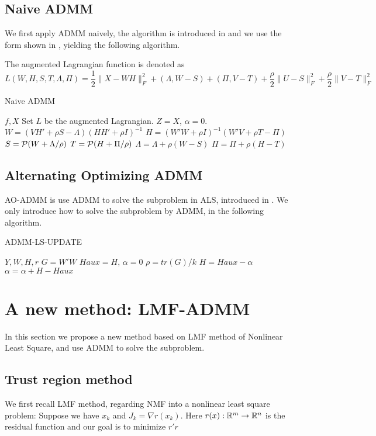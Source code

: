 \documentclass{article}
\renewcommand{\grad}{\nabla}
\begin{document}
\subsection{Naive ADMM}
We first apply ADMM naively, the algorithm is introduced in \cite{CITE} and we use the form shown in \cite{rk1admm}, yielding the following algorithm.

The augmented Lagrangian function is denoted as 
$$L(W,H,S,T,\Lambda, \Pi) = \frac{1}{2} \|X - WH\|_F^2 +  (\Lambda, W-S) + (\Pi, V-T) + \frac{\rho}{2}\|U-S\|_F^2 + \frac{\rho}{2} \|V-T\|_F^2$$

\begin{algorithm}
	\caption{Naive ADMM}
	\begin{algorithmic}[1]
		\REQUIRE $f, X$
		\STATE Set $L$ be the augmented Lagrangian.
		\STATE $Z = X$, $\alpha = 0$.
    \STATE $W = (VH'+\rho S-\Lambda)(HH'+\rho I)^{-1}$
\STATE $H = (W'W+\rho I)^{-1}(W'V+\rho T-\Pi)$
\STATE $S = \P(W + \Lambda/\rho)$
\STATE $T = \P(H + \Pi/\rho)$
\STATE $\Lambda = \Lambda + \rho(W-S)$
\STATE $\Pi = \Pi + \rho(H-T)$
		\ENDWHILE
	\end{algorithmic}
\end{algorithm}

\subsection{Alternating Optimizing ADMM}
AO-ADMM is use ADMM to solve the subproblem in ALS, introduced in \cite{aoadmm}. We only introduce how to solve the subproblem by ADMM, in the following algorithm.
\begin{algorithm}[H]
	\caption{ADMM-LS-UPDATE}
	\begin{algorithmic}[1]
		\REQUIRE $Y,W,H,r$
		\STATE $G = W'W$
		\STATE $Haux = H$, $\alpha = 0$
		\STATE $\rho = tr(G)/k$
		\STATE $H= Haux - \alpha$
		\STATE $\alpha = \alpha + H - Haux$
		\ENDFOR
	\end{algorithmic}
\end{algorithm}

\section{A new method: LMF-ADMM}
In this section we propose a new method based on LMF method of Nonlinear Least Square, and use ADMM to solve the subproblem.
\subsection{Trust region method}
We first recall LMF method, regarding NMF into a nonlinear least square problem: 
Suppose we have $x_k$ and $J_k = \grad r(x_k)$. Here $r(x) : \R^m \to \R^n$ is the residual function and our goal is to minimize $r'r$
\end{document}

